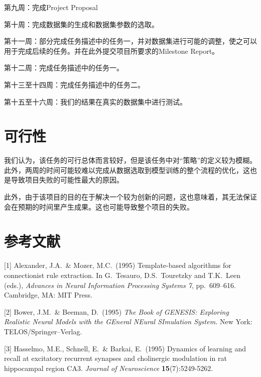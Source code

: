 \documentclass{article}
\begin{document}
第九周：完成Project Proposal

第十周：完成数据集的生成和数据集参数的选取。

第十一周：部分完成任务描述中的任务一，并对数据集进行可能的调整，使之可以用于完成后续的任务。并在此外提交项目所要求的Milestone Report。

第十二周：完成任务描述中的任务一。

第十三至十四周：完成任务描述中的任务二。

第十五至十六周：我们的结果在真实的数据集中进行测试。

\section{可行性}

我们认为，该任务的可行总体而言较好，但是该任务中对“策略”的定义较为模糊。此外，两周的时间可能较难以完成从数据选取到模型训练的整个流程的优化，这也是导致项目失败的可能性最大的原因。

此外，由于该项目的目的在于解决一个较为创新的问题，这也意味着，其无法保证会在预期的时间里产生成果。这也可能导致整个项目的失败。

\section*{参考文献}


\medskip

\small

[1] Alexander, J.A.\ \& Mozer, M.C.\ (1995) Template-based algorithms
for connectionist rule extraction. In G.\ Tesauro, D.S.\ Touretzky and
T.K.\ Leen (eds.), {\it Advances in Neural Information Processing
  Systems 7}, pp.\ 609--616. Cambridge, MA: MIT Press.

[2] Bower, J.M.\ \& Beeman, D.\ (1995) {\it The Book of GENESIS:
  Exploring Realistic Neural Models with the GEneral NEural SImulation
  System.}  New York: TELOS/Springer--Verlag.

[3] Hasselmo, M.E., Schnell, E.\ \& Barkai, E.\ (1995) Dynamics of
learning and recall at excitatory recurrent synapses and cholinergic
modulation in rat hippocampal region CA3. {\it Journal of
  Neuroscience} {\bf 15}(7):5249-5262.
\end{document}
